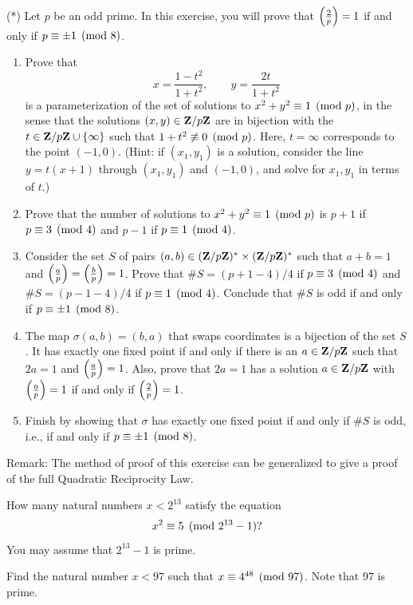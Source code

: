 \begin{exercises}
\item\label{ex:rec8} (*) Let $p$ be an odd prime. In this exercise, you
  will prove that $\left(\frac{2}{p}\right)=1$ if and only if $p\equiv
  \pm 1\pmod{8}$.
\begin{enumerate}
\item Prove that
$$
  x = \frac{1-t^2}{1+t^2}, \qquad y = \frac{2t}{1+t^2}
$$
is a parameterization of the set of solutions to $x^2+y^2\equiv 1\pmod{p}$,
in the sense that the solutions $(x,y)\in\mathbf{Z}/p\mathbf{Z}{}$ are in
bijection with the $t\in \mathbf{Z}/p\mathbf{Z}{} \cup\{\infty\}$ such that $1+t^2\not\equiv 0\pmod{p}$.
Here, $t=\infty$ corresponds to the point $(-1,0)$.
(Hint: if $(x_1,y_1)$ is a solution, consider the line $y=t(x+1)$
through $(x_1,y_1)$ and $(-1,0)$, and solve for $x_1, y_1$ in terms
of $t$.)
\item Prove that the number of solutions to $x^2+y^2\equiv 1\pmod{p}$
is $p+1$ if $p\equiv 3\pmod{4}$ and $p-1$ if $p\equiv 1\pmod{4}$.
\item Consider the set $S$ of pairs $(a,b)\in (\mathbf{Z}/p\mathbf{Z}{})^*\times (\mathbf{Z}/p\mathbf{Z}{})^*$ such
that $a+b=1$ and $\left(\frac{a}{p}\right)=\left(\frac{b}{p}\right)=1$.  Prove that
$\#S=(p+1-4)/4$ if $p\equiv 3\pmod{4}$ and $\#S = (p-1-4)/4$
if $p\equiv 1\pmod{4}$.  Conclude that $\#S$ is odd if and only if
$p\equiv \pm 1\pmod{8}$.
\item The map $\sigma(a,b)=(b,a)$ that swaps coordinates is a
  bijection of the set $S$. It has exactly one fixed point if and
  only if there is an $a\in\mathbf{Z}/p\mathbf{Z}{}$ such that $2a=1$ and $\left(\frac{a}{p}\right)=1$.
  Also, prove that $2a=1$ has a solution $a\in\mathbf{Z}/p\mathbf{Z}{}$ with $\left(\frac{a}{p}\right)=1$
if and only if $\left(\frac{2}{p}\right)=1$.
\item Finish by showing that $\sigma$ has exactly one fixed point
if and only if $\#S$ is odd, i.e., if and only if
$p\equiv \pm 1\pmod{8}$.
\end{enumerate}
Remark: The method of proof of this exercise can be generalized to give a
proof of the full Quadratic Reciprocity Law.

\item\label{ex:rec9} How many natural numbers $x < 2^{13}$ satisfy the
  equation
  $$
  x^2\equiv 5\pmod{2^{13}-1}? $$
  You may assume that $2^{13}-1$ is prime.

\item\label{ex:rec10} Find the natural number $x<97$ such that $x\equiv
  4^{48}\pmod{97}$.  Note that $97$ is prime.



\end{exercises}
